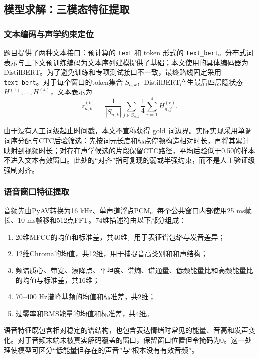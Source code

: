 \documentclass{gmcmthesis}
\newcommand{\code}[1]{\texttt{#1}}
\begin{document}
\subsection{模型求解：三模态特征提取}
\subsubsection{文本编码与声学约束定位}
题目提供了两种文本接口：预计算的 \code{text} 和 token 形式的 \code{text\_bert}。分布式词表示与上下文预训练编码为文本序列建模提供了基础\cite{mikolov2013distributed,devlin2019bert,zong2013statisticalnlp}；本文使用的具体编码器为DistilBERT\cite{sanh2019distilbert}。为了避免训练和专项测试接口不一致，最终路线固定采用 \code{text\_bert}。对于每个窗口的token集合 $S_{n,k}$，DistilBERT产生最后四层隐状态 $H^{(1)},\ldots,H^{(4)}$，文本表示为
\begin{equation}
z_{n,k}^{(t)}=\frac{1}{|S_{n,k}|}\sum_{j\in S_{n,k}}\frac{1}{4}\sum_{r=1}^{4}H_{n,j}^{(r)}.
\label{eq:text}
\end{equation}
\par\indent 由于没有人工词级起止时间戳，本文不宣称获得 gold 词边界。实际实现采用单调词序分配与CTC后验筛选\cite{graves2006connectionist}：先按词元长度和标点停顿构造相对时长，再将其累计映射到视频时长；对存在声学候选的片段保留CTC路径，平均后验低于0.50的样本不进入文本有效窗口。此处的“对齐”指可复现的弱或半强约束，而不是人工验证级强制对齐。
\subsubsection{语音窗口特征提取}
音频先由PyAV转换为16 kHz、单声道浮点PCM。每个公共窗口内部使用25 ms帧长、10 ms帧移和512点FFT。74维描述符由以下部分组成：
\begin{enumerate}[label=(\alph*),leftmargin=4em,labelsep=0.5em]
\item 20维MFCC的均值和标准差，共40维，用于表征谱包络与发音差异\cite{davis1980comparison}；
\item 12维Chroma的均值，共12维，用于捕捉音高类别和和声结构；
\item 频谱质心、带宽、滚降点、平坦度、谱熵、谱通量、低频能量比和高频能量比的均值与标准差，共16维；
\item 70--400 Hz谱峰基频的均值和标准差，共2维；
\item 过零率和RMS能量的均值和标准差，共4维。
\end{enumerate}
\par\indent 语音特征既包含相对稳定的谱结构，也包含表达情绪时常见的能量、音高和发声变化。对于音频末端未被真实解码覆盖的窗口，保留窗口位置但令掩码为0。这一处理使模型可区分“低能量但存在的声音”与“根本没有有效音频”。
\end{document}
